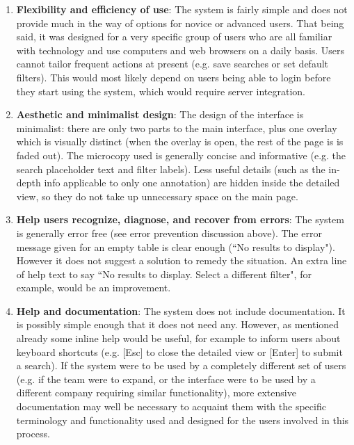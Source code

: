 \begin{enumerate}
\item \textbf{Flexibility and efficiency of use}: The system is fairly simple and does not provide much in the way of options for novice or advanced users. That being said, it was designed for a very specific group of users who are all familiar with technology and use computers and web browsers on a daily basis.  Users cannot tailor frequent actions at present (e.g. save searches or set default filters). This would most likely depend on users being able to login before they start using the system, which would require server integration. 

\item \textbf{Aesthetic and minimalist design}: The design of the interface is minimalist: there are only two parts to the main interface, plus one overlay which is visually distinct (when the overlay is open, the rest of the page is is faded out). The microcopy used is generally concise and informative (e.g. the search placeholder text and filter labels). Less useful details (such as the in-depth info applicable to only one annotation) are hidden inside the detailed view, so they do not take up unnecessary space on the main page.  

\item \textbf{Help users recognize, diagnose, and recover from errors}: The system is generally error free (see error prevention discussion above). The error message given for an empty table is clear enough (``No results to display"). However it does not suggest a solution to remedy the situation. An extra line of help text to say ``No results to display. Select a different filter", for example, would be an improvement. 

\item \textbf{Help and documentation}: The system does not include documentation. It is possibly simple enough that it does not need any. However, as mentioned already some inline help would be useful, for example to inform users about keyboard shortcuts (e.g. [Esc] to close the detailed view or [Enter] to submit a search). If the system were to be used by a completely different set of users (e.g. if the team were to expand, or the interface were to be used by a different company requiring similar functionality), more extensive documentation may well be necessary to acquaint them with the specific terminology and functionality used and designed for the users involved in this process.  
\end{enumerate}

